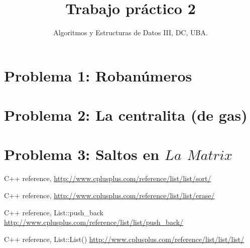 \documentclass[10pt, a4paper]{article}
\author{Algoritmos y Estructuras de Datos III, DC, UBA.}
\date{}
\title{Trabajo pr\'actico 2}
\begin{document}
\maketitle

\newpage\null\thispagestyle{empty}\newpage

\tableofcontents

\newpage
\section{Problema 1: Roban\'umeros}


\newpage
\section{Problema 2: La centralita (de gas)}


\newpage
\section{Problema 3: Saltos en $La$ $Matrix$}


\newpage
\begin{thebibliography}{2}

  C++ reference,
  \url{http://www.cplusplus.com/reference/list/list/sort/}

  C++ reference,
  \url{http://www.cplusplus.com/reference/list/list/erase/}
  
	C++ reference, List::push\_back
	\url{http://www.cplusplus.com/reference/list/list/push_back/}
	
	C++ reference, List::List()
	\url{http://www.cplusplus.com/reference/list/list/list/}	
	
  
\end{thebibliography}
\end{document}
